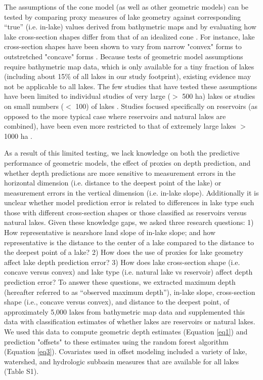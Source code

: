 \documentclass[draft]{agujournal2019}
\begin{document}
The assumptions of the cone model (as well as other geometric models) can be tested by comparing proxy measures of lake geometry against corresponding “true” (i.e. in-lake) values derived from bathymetric maps and by evaluating how lake cross-section shapes differ from that of an idealized cone \cite{johanssonNewApproachesModelling2007}. For instance, lake cross-section shapes have been shown to vary from narrow "convex" forms to outstretched "concave" forms \cite{hakansonLakeFormLake1977}. Because tests of geometric model assumptions require bathymetric map data, which is only available for a tiny fraction of lakes (including about 15\% of all lakes in our study footprint), existing evidence may not be applicable to all lakes. The few studies that have tested these assumptions have been limited to individual studies of very large ($>$ 500 ha) lakes or studies on small numbers ($<$ 100) of lakes \cite{johanssonNewApproachesModelling2007}. Studies focused specifically on reservoirs (as opposed to the more typical case where reservoirs and natural lakes are combined), have been even more restricted to that of extremely large lakes $>$ 1000 ha \cite{lehnerHighresolutionMappingWorld2011, messagerEstimatingVolumeAge2016}.

As a result of this limited testing, we lack knowledge on both the predictive performance of geometric models, the effect of proxies on depth prediction, and whether depth predictions are more sensitive to measurement errors in the horizontal dimension (i.e. distance to the deepest point of the lake) or measurement errors in the vertical dimension (i.e. in-lake slope). Additionally it is unclear whether model prediction error is related to differences in lake type such those with different cross-section shapes or those classified as reservoirs versus natural lakes. Given these knowledge gaps, we asked three research questions: 1) How representative is nearshore land slope of in-lake slope; and how representative is the distance to the center of a lake compared to the distance to the deepest point of a lake? 2) How does the use of proxies for lake geometry affect lake depth prediction error? 3) How does lake cross-section shape (i.e. concave versus convex) and lake type (i.e. natural lake vs reservoir) affect depth prediction error? To answer these questions, we extracted maximum depth (hereafter referred to as “observed maximum depth”), in-lake slope, cross-section shape (i.e., concave versus convex), and distance to the deepest point, of approximately 5,000 lakes from bathymetric map data and supplemented this data with classification estimates of whether lakes are reservoirs or natural lakes. We used this data to compute geometric depth estimates (Equation \ref{eq1}) and prediction "offsets" to these estimates using the random forest algorithm (Equation \ref{eq3}). Covariates used in offset modeling included a variety of lake, watershed, and hydrologic subbasin measures that are available for all lakes (Table S1).
\end{document}
